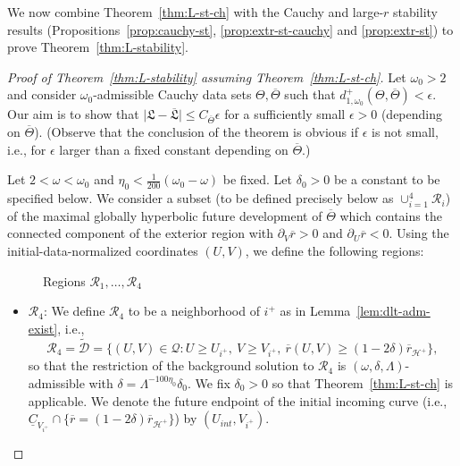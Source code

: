 \documentclass[10pt, reqno]{amsart}
\theoremstyle{definition}
\theoremstyle{remark}
\theoremstyle{conjecture}
\numberwithin{equation}{section}
\newcommand{\abs}[1]{\vert#1\vert}
\newcommand{\set}[1]{\{#1\}}
\newcommand{\rd}{\partial}
\newcommand{\0}{\emptyset}
\newcommand{\dlt}{\delta}
\newcommand{\eps}{\epsilon}
\newcommand{\Lmb}{\Lambda}
\newcommand{\Tht}{\Theta}
\newcommand{\omg}{\omega}
\newcommand{\calD}{\mathcal D}
\newcommand{\calH}{\mathcal H}
\newcommand{\calQ}{\mathcal Q}
\newcommand{\calR}{\mathcal R}
\newcommand{\PD}{\calQ}
\newcommand{\uC}{\underline{C}}
\newcommand{\EH}{\calH^{+}}
\newcommand{\rbg}{\overline{r}}					%
\begin{document}
We now combine Theorem~\ref{thm:L-st-ch} with the Cauchy and large-$r$ stability results (Propositions~\ref{prop:cauchy-st}, \ref{prop:extr-st-cauchy} and \ref{prop:extr-st}) to prove Theorem~\ref{thm:L-stability}.

\begin{proof}[Proof of Theorem~\ref{thm:L-stability} assuming Theorem~\ref{thm:L-st-ch}]
Let $\omg_{0} > 2$ and consider $\omg_{0}$-admissible Cauchy data sets $\Tht, \overline{\Tht}$ such that $d_{1, \omg_{0}}^{+}(\Tht, \overline{\Tht}) < \eps$. Our aim is to show that $\abs{\mathfrak{L} - \overline{\mathfrak{L}}} \leq C_{\overline{\Tht}} \eps$ for a sufficiently small $\eps > 0$ (depending on $\overline{\Tht}$). (Observe that the conclusion of the theorem is obvious if $\eps$ is not small, i.e., for $\eps$ larger than a fixed constant depending on $\overline{\Tht}$.)

Let $2 < \omg < \omg_{0}$ and $\eta_{0} < \frac{1}{200}(\omg_{0} - \omg)$ be fixed. Let $\dlt_{0} > 0$ be a constant to be specified below. We consider a subset (to be defined precisely below as $\cup_{i=1}^4 \calR_i$) of the maximal globally hyperbolic future development of $\overline{\Tht}$ which contains the connected component of the exterior region with $\rd_V \rbg>0$ and $\rd_U \rbg < 0$. Using the initial-data-normalized coordinates $(U, V)$, we define the following regions:
\begin{figure}[h]
\begin{center}
\def\svgwidth{300px}
 
\caption{Regions $\calR_{1}, \ldots, \calR_{4}$} \label{fig:L-stability}
\end{center}
\end{figure}

\begin{itemize}
\item $\calR_{4}$: We define $\calR_{4}$ to be a neighborhood of $i^{+}$ as in Lemma~\ref{lem:dlt-adm-exist}, i.e.,
\begin{equation*}
\calR_{4} = \widetilde{\calD} = \set{(U, V) \in \PD : U \geq U_{i^{+}}, \ V \geq V_{i^{+}}, \ \rbg(U, V) \geq (1 - 2 \dlt) \rbg_{\EH}},
\end{equation*}
so that the restriction of the background solution to $\calR_{4}$ is $(\omg, \dlt, \Lmb)$-admissible with $\dlt = \Lmb^{-100 \eta_{0}} \dlt_{0}$. We fix $\dlt_{0} > 0$ so that Theorem~\ref{thm:L-st-ch} is applicable. We denote the future endpoint of the initial incoming curve (i.e., $\uC_{V_{i^{+}}} \cap \set{\rbg = (1 - 2 \dlt) \rbg_{\EH}}$) by $(U_{int}, V_{i^{+}})$. 


\end{itemize}
\end{proof}
\end{document}
